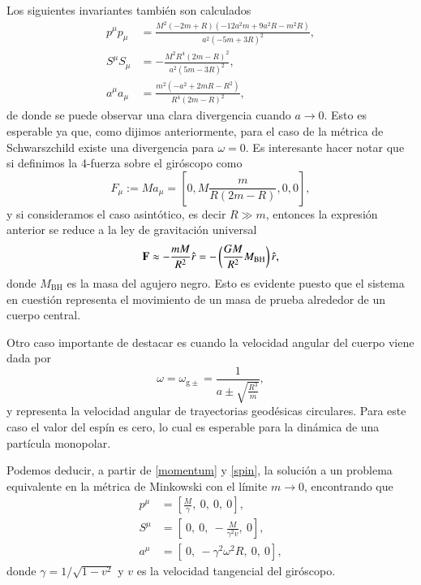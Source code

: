Los siguientes invariantes también son calculados
\begin{align}
p^{\mu} p_{\mu} &= \frac{M^{2} \left(- 2 m + R\right) \left(- 12 a^{2} m + 9 a^{2} R - m^{2} R\right)}{a^{2} \left(- 5 m + 3 R\right)^{2}},\\
S^{\mu} S_{\mu} &= - \frac{M^{2} R^{4} \left(2 m - R\right)^{2}}{a^{2} \left(5 m - 3 R\right)^{2}},\\
a^{\mu} a_{\mu} &= \frac{m^{2} \left(- a^{2} + 2 m R - R^{2}\right)}{R^{4} \left(2 m - R\right)^{2}},
\end{align}
de donde se puede observar una clara divergencia cuando $a \to 0$. Esto es esperable ya que, como dijimos anteriormente, para el caso de la métrica de Schwarszchild existe una divergencia para $\omega = 0$. Es interesante hacer notar que si definimos la 4-fuerza sobre el giróscopo como
\begin{equation}
\label{eq:124}
F_{\mu} := M a_{\mu} = \left[ 0,  M \frac{m}{R\left( 2m-R \right)} , 0, 0 \right],
\end{equation}
y si consideramos el caso asintótico, es decir $R \gg m $, entonces la expresión anterior se reduce a la ley de gravitación universal
\begin{equation}
\vb{F} \approx -\frac{mM}{R^2} \hat{r} = -\left( \frac{GM}{R^2} M_{\mathrm{BH}} \right) \hat{r},
\end{equation}
donde $M_{\mathrm{BH}}$ es la masa del agujero negro. Esto es evidente puesto que el sistema en cuestión representa el movimiento de un masa de prueba alrededor de un cuerpo central.

Otro caso importante de destacar es cuando la velocidad angular del cuerpo viene dada por
\begin{equation}
\omega =\omega_{\mathrm{g} \pm} = \frac{1}{a \pm \sqrt{\frac{R^3}{m}}},
\end{equation}
y representa la velocidad angular de trayectorias geodésicas circulares. Para este caso el valor del espín es cero, lo cual es esperable para la dinámica de una partícula monopolar.

Podemos deducir, a partir de \eqref{momentum} y \eqref{spin}, la solución a un problema equivalente en la métrica de Minkowski con el límite $m \to 0$, encontrando que
\begin{align}
\label{eq:27}
p^{\mu} &= \left[  \frac{M}{\gamma},\ 0,\ 0,\ 0 \right],\\
\label{eq:28}
S^{\mu} &= \left[\ 0,\ 0,\ -\frac{M}{\gamma^2 v}, \ 0 \right],\\
\label{eq:acent}
a^{\mu} &= \left[ \ 0,\ -\gamma^2  \omega^2 R,\ 0,\ 0 \right],
\end{align}
donde $\gamma = 1/\sqrt{1-v^2}$ y $v$ es la velocidad tangencial del giróscopo. 

